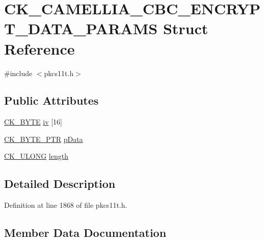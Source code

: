 \hypertarget{struct_c_k___c_a_m_e_l_l_i_a___c_b_c___e_n_c_r_y_p_t___d_a_t_a___p_a_r_a_m_s}{}\section{C\+K\+\_\+\+C\+A\+M\+E\+L\+L\+I\+A\+\_\+\+C\+B\+C\+\_\+\+E\+N\+C\+R\+Y\+P\+T\+\_\+\+D\+A\+T\+A\+\_\+\+P\+A\+R\+A\+MS Struct Reference}
\label{struct_c_k___c_a_m_e_l_l_i_a___c_b_c___e_n_c_r_y_p_t___d_a_t_a___p_a_r_a_m_s}


{\ttfamily \#include $<$pkcs11t.\+h$>$}

\subsection*{Public Attributes}
\begin{DoxyCompactItemize}
\item 
\hyperlink{pkcs11t_8h_a51e605f881c86838bf12d70707b57b85}{C\+K\+\_\+\+B\+Y\+TE} \hyperlink{struct_c_k___c_a_m_e_l_l_i_a___c_b_c___e_n_c_r_y_p_t___d_a_t_a___p_a_r_a_m_s_afbe12e15647428859ca18f31fd201f7b}{iv} \mbox{[}16\mbox{]}
\item 
\hyperlink{pkcs11t_8h_a3d7233a4077fbaf7ae76b64da0a62a21}{C\+K\+\_\+\+B\+Y\+T\+E\+\_\+\+P\+TR} \hyperlink{struct_c_k___c_a_m_e_l_l_i_a___c_b_c___e_n_c_r_y_p_t___d_a_t_a___p_a_r_a_m_s_a0477988fd2fedaaba95fe46d0a3642d2}{p\+Data}
\item 
\hyperlink{pkcs11t_8h_a35181858a3b7a0a81f49d180d8f446ef}{C\+K\+\_\+\+U\+L\+O\+NG} \hyperlink{struct_c_k___c_a_m_e_l_l_i_a___c_b_c___e_n_c_r_y_p_t___d_a_t_a___p_a_r_a_m_s_afd4cbb1fa44f9e278682c8c6425ee080}{length}
\end{DoxyCompactItemize}


\subsection{Detailed Description}


Definition at line 1868 of file pkcs11t.\+h.



\subsection{Member Data Documentation}
\mbox{\label{struct_c_k___c_a_m_e_l_l_i_a___c_b_c___e_n_c_r_y_p_t___d_a_t_a___p_a_r_a_m_s_afbe12e15647428859ca18f31fd201f7b}} 
